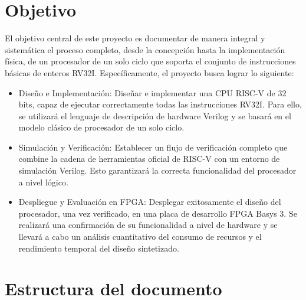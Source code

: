 \section{Objetivo}
\label{sec:intro:obj}

El objetivo central de este proyecto es documentar de manera integral y sistemática el proceso completo, desde la concepción hasta la implementación física, de un procesador de un solo ciclo que soporta el conjunto de instrucciones básicas de enteros RV32I. Específicamente, el proyecto busca lograr lo siguiente:

\begin{itemize}
\item Diseño e Implementación: Diseñar e implementar una CPU RISC-V de 32 bits, capaz de ejecutar correctamente todas las instrucciones RV32I. Para ello, se utilizará el lenguaje de descripción de hardware Verilog y se basará en el modelo clásico de procesador de un solo ciclo.

\item Simulación y Verificación: Establecer un flujo de verificación completo que combine la cadena de herramientas oficial de RISC-V con un entorno de simulación Verilog. Esto garantizará la correcta funcionalidad del procesador a nivel lógico.

\item Despliegue y Evaluación en FPGA: Desplegar exitosamente el diseño del procesador, una vez verificado, en una placa de desarrollo FPGA Basys 3. Se realizará una confirmación de su funcionalidad a nivel de hardware y se llevará a cabo un análisis cuantitativo del consumo de recursos y el rendimiento temporal del diseño sintetizado.

\end{itemize}


\section{Estructura del documento}

